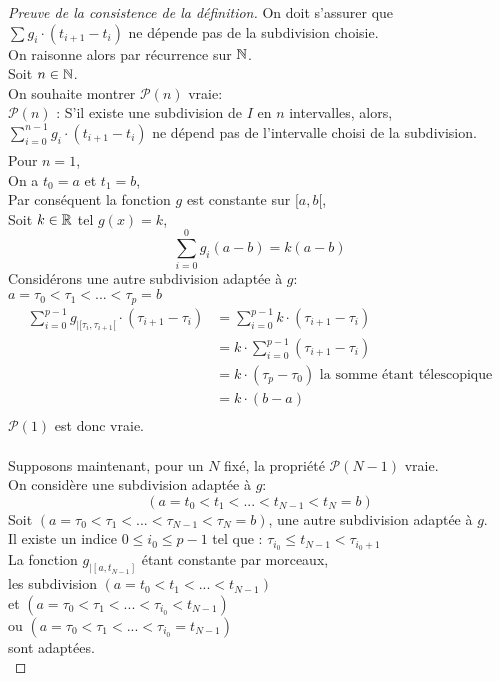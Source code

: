 \documentclass[../main.tex]{subfile}
\begin{document}
\begin{proof}[Preuve de la consistence de la définition]
	On doit s'assurer que $\sum g_i \cdot (t_{i+1} - t_i)$ ne dépende pas de la subdivision choisie.\\

	On raisonne alors par récurrence sur $\mathbb{N}$.\\
	Soit $n \in \mathbb{N}$.\\
	On souhaite montrer $\mathcal{P}(n)$ vraie:\\
	$\mathcal{P}(n)$ : S'il existe une subdivision de $I$ en $n$ intervalles, alors, $\sum\limits_{i=0}^{n-1} g_i \cdot (t_{i+1} - t_i)$ ne dépend pas de l'intervalle choisi de la subdivision.
	$$\phantom{a}$$
	Pour $n=1$, \\
	On a $t_0 = a$ et $t_1 = b$, \\
	Par conséquent la fonction $g$ est constante sur $[a,b[$, \\
	Soit $k \in \mathbb{R}$ tel $g(x) = k$, \\
	$$\sum\limits_{i=0}^0 g_i(a-b) = k(a-b)$$
	Considérons une autre subdivision adaptée à $g$:\\
	$a = \tau_0 < \tau_1 < ... < \tau_p = b$\\
	$$
	\begin{aligned}
		\sum\limits_{i=0}^{p-1} g_{|[\tau_i, \tau_{i+1}[} \cdot (\tau_{i+1} - \tau_i) &= \sum\limits_{i=0}^{p-1} k \cdot (\tau_{i+1} - \tau_i)\\
		&= k \cdot \sum\limits_{i=0}^{p-1} (\tau_{i+1} - \tau_i)\\
		&= k \cdot (\tau_{p} - \tau_0) \text{ la somme étant télescopique}\\
		&= k \cdot (b - a)\\
	\end{aligned}
	$$
	$\mathcal{P}(1)$ est donc vraie.\\
	$$\phantom{a}$$

	Supposons maintenant, pour un $N$ fixé, la propriété $\mathcal{P}(N-1)$ vraie.\\
	On considère une subdivision adaptée à $g$:
	$$(a= t_0 < t_1 < ... < t_{N-1} < t_N = b)$$
	Soit $(a = \tau_0 < \tau_1 < ... < \tau_{N-1} < \tau_N = b)$, une autre subdivision adaptée à $g$.\\
	Il existe un indice $0 \leq i_0 \leq p-1$ tel que : $\tau_{i_0} \leq t_{N-1} < \tau_{i_0 + 1}$\\

	La fonction $g_{|[a, t_{N-1}]}$ étant constante par morceaux, \\
	les subdivision $(a = t_0 < t_1 < ... < t_{N-1})$\\
	et $(a = \tau_0 < \tau_1 < ... < \tau_{i_0} < t_{N-1})$\\
	ou $(a = \tau_0 < \tau_1 < ... < \tau_{i_0} = t_{N-1})$\\
	sont adaptées.\\


\end{proof}
\end{document}
